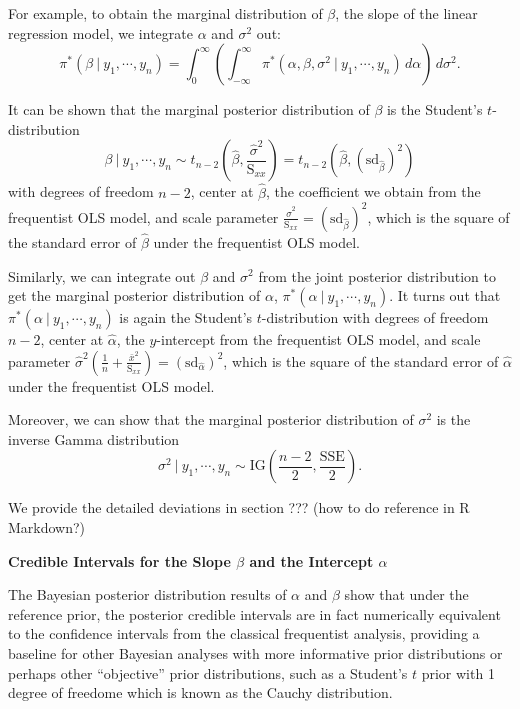\documentclass[]{book}
\theoremstyle{definition}
\theoremstyle{definition}
\theoremstyle{definition}
\theoremstyle{remark}
\begin{document}
For example, to obtain the marginal distribution of \(\beta\), the slope
of the linear regression model, we integrate \(\alpha\) and \(\sigma^2\)
out:
\[ \pi^*(\beta~|~y_1,\cdots,y_n) = \int_0^\infty \left(\int_{-\infty}^\infty \pi^*(\alpha, \beta, \sigma^2~|~y_1,\cdots, y_n)\, d\alpha\right)\, d\sigma^2. \]

It can be shown that the marginal posterior distribution of \(\beta\) is
the Student's \(t\)-distribution
\[ \beta~|~y_1,\cdots,y_n \sim t_{n-2}\left(\hat{\beta}, \frac{\hat{\sigma}^2}{\text{S}_{xx}}\right) = t_{n-2}\left(\hat{\beta}, (\text{sd}_{\hat{\beta}})^2\right) \]
with degrees of freedom \(n-2\), center at \(\hat{\beta}\), the
coefficient we obtain from the frequentist OLS model, and scale
parameter
\(\displaystyle \frac{\hat{\sigma}^2}{\text{S}_{xx}}=\left(\text{sd}_{\hat{\beta}}\right)^2\),
which is the square of the standard error of \(\hat{\beta}\) under the
frequentist OLS model.

Similarly, we can integrate out \(\beta\) and \(\sigma^2\) from the
joint posterior distribution to get the marginal posterior distribution
of \(\alpha\), \(\pi^*(\alpha~|~y_1,\cdots, y_n)\). It turns out that
\(\pi^*(\alpha~|~y_1,\cdots,y_n)\) is again the Student's
\(t\)-distribution with degrees of freedom \(n-2\), center at
\(\hat{\alpha}\), the \(y\)-intercept from the frequentist OLS model,
and scale parameter
\(\displaystyle \hat{\sigma}^2\left(\frac{1}{n}+\frac{\bar{x}^2}{\text{S}_{xx}}\right) = \left(\text{sd}_{\hat{\alpha}}\right)^2\),
which is the square of the standard error of \(\hat{\alpha}\) under the
frequentist OLS model.

Moreover, we can show that the marginal posterior distribution of
\(\sigma^2\) is the inverse Gamma distribution
\[ \sigma^2~|~y_1,\cdots,y_n \sim \text{IG}\left(\frac{n-2}{2}, \frac{\text{SSE}}{2}\right). \]

We provide the detailed deviations in section ??? (how to do reference
in R Markdown?)

\textbf{Credible Intervals for the Slope \(\beta\) and the Intercept
\(\alpha\) }

The Bayesian posterior distribution results of \(\alpha\) and \(\beta\)
show that under the reference prior, the posterior credible intervals
are in fact numerically equivalent to the confidence intervals from the
classical frequentist analysis, providing a baseline for other Bayesian
analyses with more informative prior distributions or perhaps other
``objective'' prior distributions, such as a Student's \(t\) prior with
1 degree of freedome which is known as the Cauchy distribution.
\end{document}
